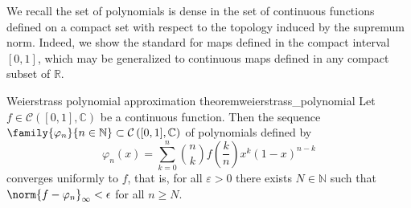 We recall the set of polynomials is dense in the set of continuous functions defined on a compact set with respect to the topology induced by the supremum norm. Indeed, we show the standard  for maps defined in the compact interval \([0,1]\), which may be generalized to continuous maps defined in any compact subset of \(\mathbb{R}\).
\begin{theorem}{Weierstrass polynomial approximation theorem}{weierstrass_polynomial}
    Let \(f \in \mathcal{C}\left([0,1], \mathbb{C}\right)\) be a continuous function. Then the sequence \(\family{\varphi_n}{n \in \mathbb{N}}\subset\mathcal{C}\left([0,1], \mathbb{C}\right)\) of polynomials defined by
    \begin{equation*}
        \varphi_n(x) = \sum_{k = 0}^n \binom{n}{k} f\left(\frac{k}{n}\right) x^k (1 - x)^{n - k}
    \end{equation*}
    converges uniformly to \(f\), that is, for all \(\varepsilon > 0\) there exists \(N \in \mathbb{N}\) such that \(\norm{f - \varphi_n}_\infty < \epsilon\) for all \(n \geq N\).
\end{theorem}
